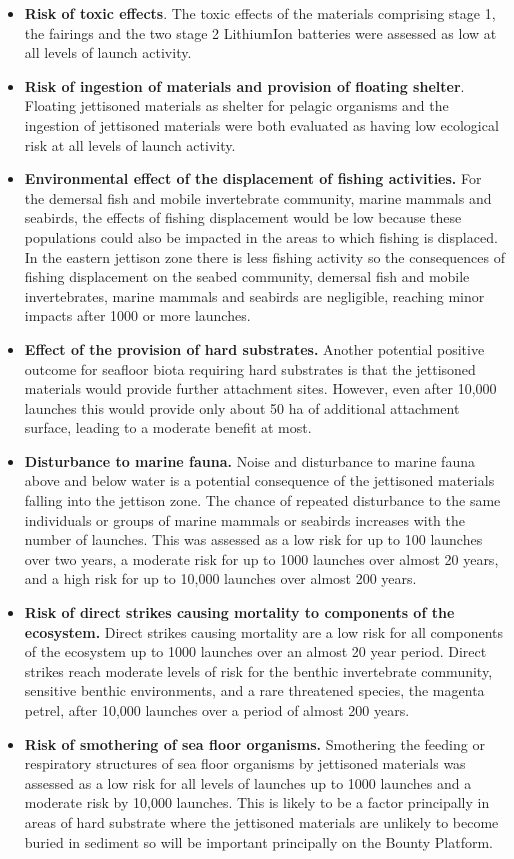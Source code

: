 \begin{itemize}
\item \textbf{Risk of toxic effects}. The toxic effects of the materials comprising stage 1, the fairings and the two stage 2 LithiumIon batteries were assessed as low at all levels of launch activity.
\item \textbf{Risk of ingestion of materials and provision of floating shelter}. Floating jettisoned materials as shelter for pelagic organisms and the ingestion of jettisoned materials were both evaluated as having low ecological risk at all levels of launch activity.
\item \textbf{Environmental effect of the displacement of fishing activities.} For the demersal fish
and mobile invertebrate community, marine mammals and seabirds, the effects of fishing displacement would be low because these populations could also be impacted in the areas to which fishing is displaced. In the eastern jettison zone there is less fishing activity so the consequences of fishing displacement on the seabed community, demersal fish and mobile invertebrates, marine mammals and seabirds are negligible, reaching minor impacts after 1000 or more launches.
\item \textbf{Effect of the provision of hard substrates.} Another potential positive outcome for seafloor biota requiring hard substrates is that the jettisoned materials would provide further attachment sites. However, even after 10,000 launches this would provide only about 50 ha of additional attachment surface, leading to a moderate benefit at most.
\item \textbf{Disturbance to marine fauna.} Noise and disturbance to marine fauna above and below water is a potential consequence of
the jettisoned materials falling into the jettison zone. The chance of repeated disturbance to the same individuals or groups of marine mammals or seabirds increases with the number of launches. This was assessed as a low risk for up to 100 launches over two years, a moderate risk for up to 1000 launches over almost 20 years, and a high risk for up to 10,000 launches over almost 200 years.
\item \textbf{Risk of direct strikes causing mortality to components of the ecosystem.} Direct strikes causing mortality are a low risk for all components of the ecosystem up to 1000 launches over an almost 20 year period. Direct strikes reach moderate levels of risk for the benthic invertebrate community, sensitive benthic environments, and a rare threatened species, the magenta petrel, after 10,000 launches over a period of almost 200 years.
\item \textbf{Risk of smothering of sea floor organisms.} Smothering the feeding or respiratory structures of sea floor organisms by jettisoned materials was assessed as a low risk for all levels of launches up to 1000 launches and a moderate risk by 10,000 launches. This is likely to be a factor principally in areas of hard substrate where the jettisoned materials are unlikely to become buried in sediment so will be important principally on the Bounty Platform.
\end{itemize}


